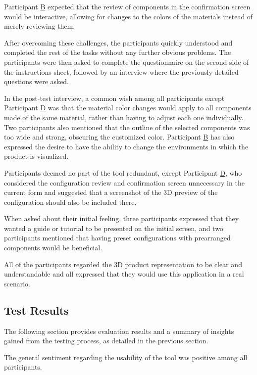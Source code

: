 Participant \hyperref[itm:B]{B} expected that the review of components in the confirmation screen would be interactive, allowing for changes to the colors of the materials instead of merely reviewing them.

After overcoming these challenges, the participants quickly understood and completed the rest of the tasks without any further obvious problems. The participants were then asked to complete the  questionnaire on the second side of the instructions sheet, followed by an interview where the previously detailed questions were asked.

In the post-test interview, a common wish among all participants except Participant \hyperref[itm:D]{D} was that the material color changes would apply to all components made of the same material, rather than having to adjust each one individually. Two participants also mentioned that the outline of the selected components was too wide and strong, obscuring the customized color. Participant \hyperref[itm:B]{B} has also expressed the desire to have the ability to change the environments in which the product is visualized.

Participants deemed no part of the tool redundant, except Participant \hyperref[itm:D]{D}, who considered the configuration review and confirmation screen unnecessary in the current form and suggested that a screenshot of the 3D preview of the configuration should also be included there.

When asked about their initial feeling, three participants expressed that they wanted a guide or tutorial to be presented on the initial screen, and two participants mentioned that having preset configurations with prearranged components would be beneficial.  

All of the participants regarded the 3D product representation to be clear and understandable and all expressed that they would use this application in a real scenario.


\subsection{Test Results}

The following section provides evaluation results and a summary of insights gained from the testing process, as detailed in the previous section.

The general sentiment regarding the usability of the tool was positive among all participants.

